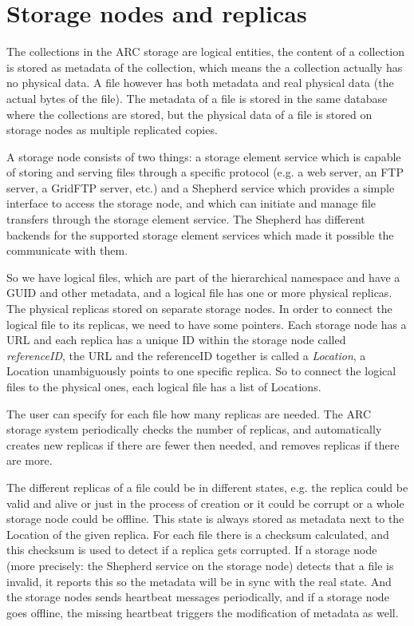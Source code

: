\documentclass{book}
\begin{document}

\section{Storage nodes and replicas} %
\label{sec:storage_nodes_and_replicas}

The collections in the ARC storage are logical entities, the content of a collection is stored as metadata of the collection, which means the a collection actually has no physical data. A file however has both metadata and real physical data (the actual bytes of the file). The metadata of a file is stored in the same database where the collections are stored, but the physical data of a file is stored on storage nodes as multiple replicated copies.

A storage node consists of two things: a storage element service which is capable of storing and serving files through a specific protocol (e.g. a web server, an FTP server, a GridFTP server, etc.) and a Shepherd service which provides a simple interface to access the storage node, and which can initiate and manage file transfers through the storage element service. The Shepherd has different backends for the supported storage element services which made it possible the communicate with them.

So we have logical files, which are part of the hierarchical namespace and have a GUID and other metadata, and a logical file has one or more physical replicas. The physical replicas stored on separate storage nodes. In order to connect the logical file to its replicas, we need to have some pointers. Each storage node has a URL and each replica has a unique ID within the storage node called \emph{referenceID}, the URL and the referenceID together is called a \emph{Location}, a Location unambiguously points to one specific replica. So to connect the logical files to the physical ones, each logical file has a list of Locations.

The user can specify for each file how many replicas are needed. The ARC storage system periodically checks the number of replicas, and automatically creates new replicas if there are fewer then needed, and removes replicas if there are more. 

The different replicas of a file could be in different states, e.g. the replica could be valid and alive or just in the process of creation or it could be corrupt or a whole storage node could be offline. This state is always stored as metadata next to the Location of the given replica. For each file there is a checksum calculated, and this checksum is used to detect if a replica gets corrupted. If a storage node (more precisely: the Shepherd service on the storage node) detects that a file is invalid, it reports this so the metadata will be in sync with the real state. And the storage nodes sends heartbeat messages periodically, and if a storage node goes offline, the missing heartbeat triggers the modification of metadata as well. 
\end{document}
